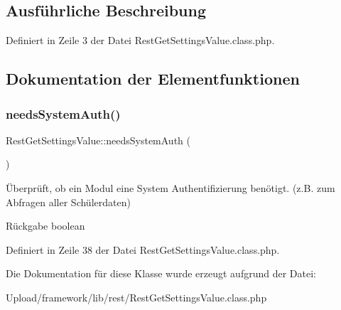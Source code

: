 \subsection{Ausführliche Beschreibung}


Definiert in Zeile 3 der Datei Rest\+Get\+Settings\+Value.\+class.\+php.



\subsection{Dokumentation der Elementfunktionen}
\mbox{\label{class_rest_get_settings_value_afb390345641cf356b8e5b2391bfa2e4b}} 
\subsubsection{\texorpdfstring{needs\+System\+Auth()}{needsSystemAuth()}}
{\footnotesize\ttfamily Rest\+Get\+Settings\+Value\+::needs\+System\+Auth (\begin{DoxyParamCaption}{ }\end{DoxyParamCaption})}

Überprüft, ob ein Modul eine System Authentifizierung benötigt. (z.\+B. zum Abfragen aller Schülerdaten) \begin{DoxyReturn}{Rückgabe}
boolean 
\end{DoxyReturn}


Definiert in Zeile 38 der Datei Rest\+Get\+Settings\+Value.\+class.\+php.



Die Dokumentation für diese Klasse wurde erzeugt aufgrund der Datei\+:\begin{DoxyCompactItemize}
\item 
Upload/framework/lib/rest/Rest\+Get\+Settings\+Value.\+class.\+php\end{DoxyCompactItemize}
